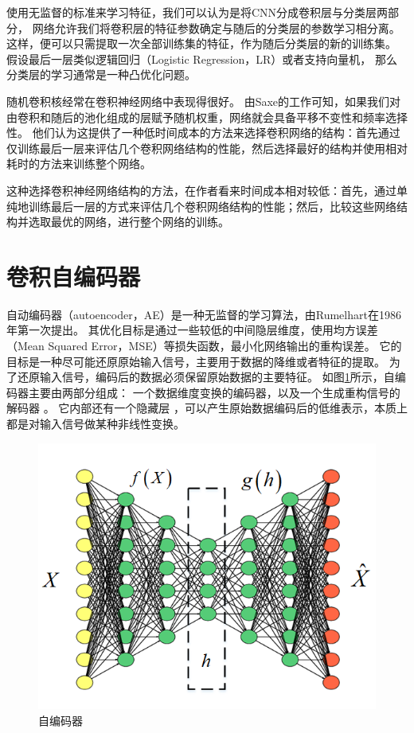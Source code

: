 使用无监督的标准来学习特征，我们可以认为是将CNN分成卷积层与分类层两部分，
网络允许我们将卷积层的特征参数确定与随后的分类层的参数学习相分离。
这样，便可以只需提取一次全部训练集的特征，作为随后分类层的新的训练集。
假设最后一层类似逻辑回归（Logistic Regression，LR）或者支持向量机，
那么分类层的学习通常是一种凸优化问题。\par
随机卷积核经常在卷积神经网络中表现得很好。
由Saxe的工作可知，如果我们对由卷积和随后的池化组成的层赋予随机权重，网络就会具备平移不变性和频率选择性\cite{saxe2011random}。
他们认为这提供了一种低时间成本的方法来选择卷积网络的结构：首先通过仅训练最后一层来评估几个卷积网络结构的性能，然后选择最好的结构并使用相对耗时的方法来训练整个网络。

这种选择卷积神经网络结构的方法，在作者看来时间成本相对较低：首先，通过单纯地训练最后一层的方式来评估几个卷积网络结构的性能；然后，比较这些网络结构并选取最优的网络，进行整个网络的训练。


\section{卷积自编码器}

自动编码器（autoencoder，AE）是一种无监督的学习算法，由Rumelhart在1986年第一次提出\cite{rumelhart1986learning}。
其优化目标是通过一些较低的中间隐层维度，使用均方误差（Mean Squared Error，MSE）等损失函数，最小化网络输出的重构误差。
它的目标是一种尽可能还原原始输入信号，主要用于数据的降维或者特征的提取。
为了还原输入信号，编码后的数据必须保留原始数据的主要特征。
如图\ref{sec:fig_2_5}所示，自编码器主要由两部分组成：
一个数据维度变换的编码器，以及一个生成重构信号的解码器 。
它内部还有一个隐藏层 ，可以产生原始数据编码后的低维表示，本质上都是对输入信号做某种非线性变换。\par
\begin{figure}[!h]
	\centering
	\includegraphics[scale=0.7]{figures/chapter_2/fig_2_5}
	\caption{自编码器}	\label{sec:fig_2_5}
\end{figure}

